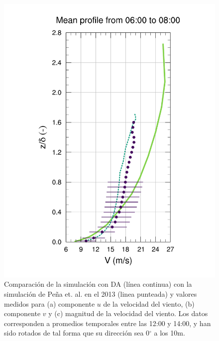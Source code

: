 \begin{figure}[H]
\begin{center}
	\includegraphics[height=0.61\linewidth,page=37,trim={48mm 10mm 38mm 25mm},clip]{Imagenes/06/hov_da/9V}%
	\end{center}
	\caption{Comparación de la simulación con DA (línea continua) con la simulación de Peña et. al. en el 2013 (linea punteada) y valores medidos para (a) componente $u$ de la velocidad del viento, (b) componente $v$ y (c) magnitud de la velocidad del viento. Los datos corresponden a promedios temporales entre las 12:00 y 14:00, y han sido rotados de tal forma que su dirección sea 0$^\circ$ a los 10m.}
	\label{fig:06_hov_da_peña}
\end{figure}

